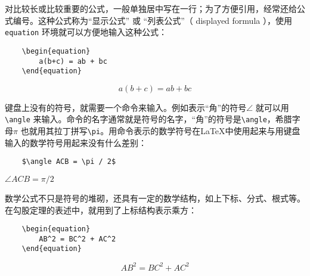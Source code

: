 对比较长或比较重要的公式，一般单独居中写在一行；为了方便引用，经常还给公式编号。这种公式称为“显示公式” 或 “列表公式”（ displayed formula ），使用\verb|equation| 环境就可以方便地输入这种公式：

\begin{minipage}[t]{0.45\textwidth}
    \begin{lstlisting}
    \begin{equation}
        a(b+c) = ab + bc
    \end{equation}
    \end{lstlisting}
\end{minipage}
\hfill
\begin{minipage}[t]{0.45\textwidth}
    \begin{equation}
        a(b+c) = ab + bc
    \end{equation}
\end{minipage}

键盘上没有的符号，就需要一个命令来输入。例如表示“角”的符号$\angle$ 就可以用\verb|\angle| 来输入。命令的名字通常就是符号的名字，“角”的符号是\verb|\angle|，希腊字母$\pi$ 也就用其拉丁拼写\verb|\pi|。用命令表示的数学符号在\LaTeX 中使用起来与用键盘输入的数学符号用起来没有什么差别：

\begin{minipage}[t]{0.45\textwidth}
    \begin{lstlisting}
    $\angle ACB = \pi / 2$
    \end{lstlisting}
\end{minipage}
\hfill
\begin{minipage}[t]{0.45\textwidth}
    \vspace{0.1cm}
    \hspace{2.8cm} $\angle ACB = \pi / 2$
\end{minipage}

数学公式不只是符号的堆砌，还具有一定的数学结构，如上下标、分式、根式等。在勾股定理的表述中，就用到了上标结构表示乘方：

\begin{minipage}[t]{0.45\textwidth}
    \begin{lstlisting}
    \begin{equation}
        AB^2 = BC^2 + AC^2 
    \end{equation}
    \end{lstlisting}
\end{minipage}
\hfill
\begin{minipage}[t]{0.45\textwidth}
    \begin{equation}
        AB^2 = BC^2 + AC^2 
    \end{equation}
\end{minipage}

